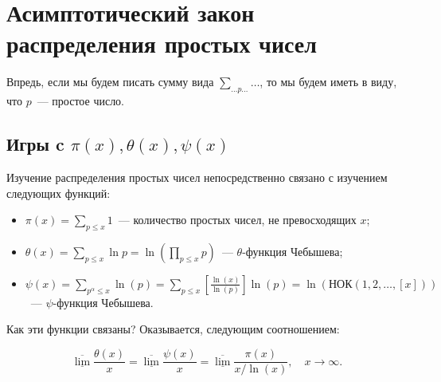 \section{Асимптотический закон распределения простых чисел}
\begin{note}
	Впредь, если мы будем писать сумму вида $\displaystyle \sum_{ \ldots p \ldots} \ldots$, то мы будем иметь в виду, что $p$ — простое число.
\end{note}

\subsection{Игры c $\pi(x), \theta(x), \psi(x)$}
Изучение распределения простых чисел непосредственно связано с изучением следующих функций:
\begin{itemize}[nolistsep]
   \item $\displaystyle \pi(x) = \sum_{p \leq x} 1$ — количество простых чисел, не превосходящих $x$;
   \item $\displaystyle \theta(x) = \sum_{p \leq x} \ln p = \ln \left(\prod_{p \leq x} p\right)$ — $\theta$-функция Чебышева;
   \item $\displaystyle \psi(x) = \sum_{p^{\alpha} \leq x} \ln(p) = \sum_{p \leq x} \left[\frac{\ln(x)}{\ln(p)}\right] \ln(p) = \ln \left( \text{НОК}(1, 2, \ldots, [x]) \right)$ — $\psi$-функция Чебышева.
\end{itemize}
Как эти функции связаны? Оказывается, следующим соотношением:
\begin{lemma} \label{l1_lm1}
	$$\underline{\overline{\lim}} \frac{\theta(x)}{x} = \underline{\overline{\lim}} \frac{\psi(x)}{x} = \underline{\overline{\lim}} \frac{\pi(x)}{x / \ln(x)}, \quad x \to \infty.$$
\end{lemma}
